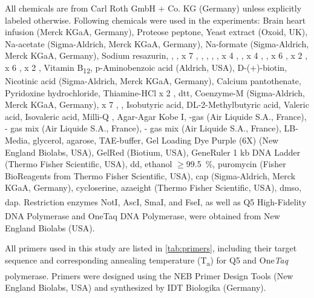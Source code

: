 All chemicals are from Carl Roth GmbH + Co. KG (Germany) unless explicitly labeled otherwise.
Following chemicals were used in the experiments:
Brain heart infusion (Merck KGaA, Germany), Proteose peptone, Yeast extract (Oxoid, UK), Na-acetate (Sigma-Aldrich, Merck KGaA, Germany), Na-formate (Sigma-Aldrich, Merck KGaA, Germany), Sodium resazurin, , ,  x 7 , , , , ,  x 4 , ,  x 4 , ,  x 6 ,  x 2 ,  x 6 ,  x 2 , Vitamin B\textsubscript{12}, p-Aminobenzoic acid (Aldrich, USA), D-(+)-biotin, Nicotinic acid (Sigma-Aldrich, Merck KGaA, Germany), Calcium pantothenate, Pyridoxine hydrochloride, Thiamine-HCl x 2 , \acrlong{dtt}, Coenzyme-M (Sigma-Aldrich, Merck KGaA, Germany),  x 7 , , Isobutyric acid, DL-2-Methylbutyric acid, Valeric acid, Isovaleric acid, Milli-Q , Agar-Agar Kobe I, -gas (Air Liquide S.A., France), - gas mix (Air Liquide S.A.,  France), - gas mix (Air Liquide S.A., France), LB-Media, glycerol, agarose, TAE-buffer, Gel Loading Dye Purple (6X) (New England Biolabs, USA), GelRed (Biotium, USA), GeneRuler 1 kb DNA Ladder (Thermo Fisher Scientific, USA), dd, ethanol $\geq$99.5~\%, puromycin (Fisher BioReagents from Thermo Fisher Scientific, USA), \acrfull{cap} (Sigma-Aldrich, Merck KGaA, Germany), cycloserine, \acrlong{azaeight} (Thermo Fisher Scientific, USA), \acrlong{dmso}, \acrlong{dap}. Restriction enzymes NotI, AscI, SmaI, and FseI, as well as Q5\textsuperscript{\textregistered} High-Fidelity DNA Polymerase and OneTaq\textsuperscript{\textregistered} DNA Polymerase, were obtained from New England Biolabs (USA).\newpage

All primers used in this study are listed in \cref{tab:primers}, including their target sequence and corresponding annealing temperature (T\textsubscript{a}) for Q5 and One\textit{Taq} polymerase. Primers were designed using the NEB\textsuperscript{\textregistered} Primer Design Tools (New England Biolabs, USA) and synthesized by IDT Biologika (Germany). 

